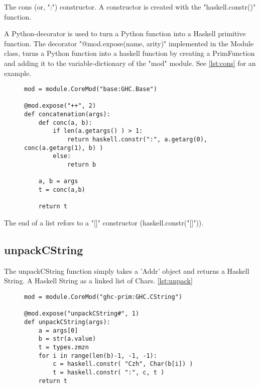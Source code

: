 The cons (or, ":") constructor. A constructor is created with the "haskell.constr()"
function.

A Python-decorator is used to turn a Python function into a Haskell primitive function.
The decorator "@mod.expose(name, arity)" implemented in the Module class, turns a Python 
function into a haskell function by creating a PrimFunction and adding it to the 
variable-dictionary of the "mod" module. See \ref{lst:cons} for an example.

\begin{figure}[H]
\lstset{ %
language=Python,
caption=Implementation of the Haskell ++ (concatenation) operator.,
label=lst:cons
}

\begin{lstlisting}
mod = module.CoreMod("base:GHC.Base")

@mod.expose("++", 2)
def concatenation(args):
    def conc(a, b):
        if len(a.getargs() ) > 1:
            return haskell.constr(":", a.getarg(0), conc(a.getarg(1), b) )
        else:
            return b

    a, b = args
    t = conc(a,b)

    return t 
\end{lstlisting}
\end{figure}


The end of a list refors to a "[]" constructor (haskell.constr("[]")).


\subsection{unpackCString}

The unpackCString function simply takes a 'Addr' object and returns a
Haskell String. A Haskell String as a linked list of Chars. \ref{lst:unpack}

\begin{figure}[H]
\lstset{ %
language=Python,
caption=Implementation of the unpackCString function.,
label=lst:unpack
}

\begin{lstlisting}
mod = module.CoreMod("ghc-prim:GHC.CString")

@mod.expose("unpackCString#", 1)
def unpackCString(args):
    a = args[0]
    b = str(a.value)
    t = types.zmzn 
    for i in range(len(b)-1, -1, -1):
        c = haskell.constr( "Czh", Char(b[i]) )
        t = haskell.constr( ":", c, t )
    return t 
\end{lstlisting}
\end{figure}

